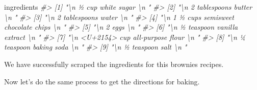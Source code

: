 \documentclass[
  12pt,
]{book}
\newenvironment{Shaded}{\begin{snugshade}}{\end{snugshade}}
\newcommand{\CommentTok}[1]{\textcolor[rgb]{0.37,0.37,0.37}{\textit{#1}}}
\newcommand{\NormalTok}[1]{#1}
\begin{document}
\begin{Shaded}
\begin{Highlighting}[]
\NormalTok{ingredients}
\CommentTok{\#\textgreater{} [1] "\textbackslash{}n                                                ½ cup white sugar \textbackslash{}n                                            "                 }
\CommentTok{\#\textgreater{} [2] "\textbackslash{}n                                                2 tablespoons butter \textbackslash{}n                                            "              }
\CommentTok{\#\textgreater{} [3] "\textbackslash{}n                                                2 tablespoons water \textbackslash{}n                                            "               }
\CommentTok{\#\textgreater{} [4] "\textbackslash{}n                                                1 ½ cups semisweet chocolate chips \textbackslash{}n                                            "}
\CommentTok{\#\textgreater{} [5] "\textbackslash{}n                                                2  eggs \textbackslash{}n                                            "                           }
\CommentTok{\#\textgreater{} [6] "\textbackslash{}n                                                ½ teaspoon vanilla extract \textbackslash{}n                                            "        }
\CommentTok{\#\textgreater{} [7] "\textbackslash{}n                                                \textless{}U+2154\textgreater{} cup all{-}purpose flour \textbackslash{}n                                            "    }
\CommentTok{\#\textgreater{} [8] "\textbackslash{}n                                                ¼ teaspoon baking soda \textbackslash{}n                                            "            }
\CommentTok{\#\textgreater{} [9] "\textbackslash{}n                                                ½ teaspoon salt \textbackslash{}n                                            "}
\end{Highlighting}
\end{Shaded}

We have successfully scraped the ingredients for this brownies recipes.

Now let's do the same process to get the directions for baking.
\end{document}
